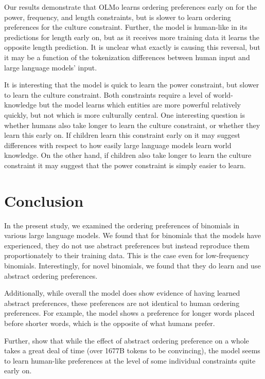 \documentclass[
  12pt,
  letterpaper,
]{scrreprt}
\begin{document}
Our results demonstrate that OLMo learns ordering preferences early on
for the power, frequency, and length constraints, but is slower to learn
ordering preferences for the culture constraint. Further, the model is
human-like in its predictions for length early on, but as it receives
more training data it learns the opposite length prediction. It is
unclear what exactly is causing this reversal, but it may be a function
of the tokenization differences between human input and large language
models' input.

It is interesting that the model is quick to learn the power constraint,
but slower to learn the culture constraint. Both constraints require a
level of world-knowledge but the model learns which entities are more
powerful relatively quickly, but not which is more culturally central.
One interesting question is whether humans also take longer to learn the
culture constraint, or whether they learn this early on. If children
learn this constraint early on it may suggest differences with respect
to how easily large language models learn world knowledge. On the other
hand, if children also take longer to learn the culture constraint it
may suggest that the power constraint is simply easier to learn.

\section{Conclusion}\label{conclusion-1}

In the present study, we examined the ordering preferences of binomials
in various large language models. We found that for binomials that the
models have experienced, they do not use abstract preferences but
instead reproduce them proportionately to their training data. This is
the case even for low-frequency binomials. Interestingly, for novel
binomials, we found that they do learn and use abstract ordering
preferences.

Additionally, while overall the model does show evidence of having
learned abstract preferences, these preferences are not identical to
human ordering preferences. For example, the model shows a preference
for longer words placed before shorter words, which is the opposite of
what humans prefer.

Further, show that while the effect of abstract ordering preference on a
whole takes a great deal of time (over 1677B tokens to be convincing),
the model seems to learn human-like preferences at the level of some
individual constraints quite early on.
\end{document}
